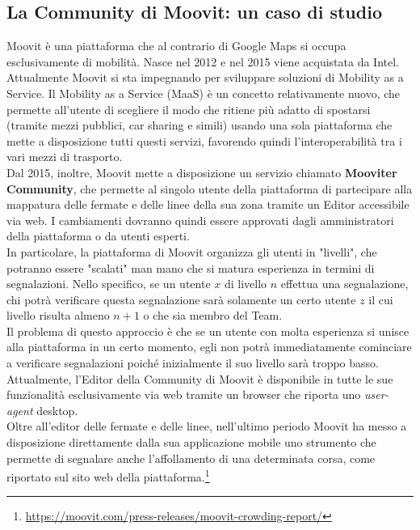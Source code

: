     \subsection{La Community di Moovit: un caso di studio}
        Moovit è una piattaforma che al contrario di Google Maps si occupa esclusivamente di mobilità.
        Nasce nel 2012 e nel 2015 viene acquistata da Intel. Attualmente Moovit si sta impegnando per sviluppare soluzioni di Mobility as a Service.
        Il Mobility as a Service (MaaS) è un concetto relativamente nuovo, che permette all'utente di scegliere il modo che ritiene più adatto di spostarsi (tramite mezzi pubblici, car sharing e simili) usando una sola piattaforma che mette a disposizione tutti questi servizi, favorendo quindi l'interoperabilità tra i vari mezzi di trasporto. \\

        Dal 2015, inoltre, Moovit mette a disposizione un servizio chiamato \textbf{Mooviter Community}, che permette al singolo utente della piattaforma di partecipare alla mappatura delle fermate e delle linee della sua zona tramite un Editor accessibile via web. I cambiamenti dovranno quindi essere approvati dagli amministratori della piattaforma o da utenti esperti. \\

        In particolare, la piattaforma di Moovit organizza gli utenti in "livelli", che potranno essere "scalati" man mano che si matura esperienza in termini di segnalazioni. Nello specifico, se un utente $x$ di livello $n$ effettua una segnalazione, chi potrà verificare questa segnalazione sarà solamente un certo utente $z$ il cui livello risulta almeno $n + 1$ o che sia membro del Team. \\
        Il problema di questo approccio è che se un utente con molta esperienza si unisce alla piattaforma in un certo momento, egli non potrà immediatamente cominciare a verificare segnalazioni poiché inizialmente il suo livello sarà troppo basso.\\
        Attualmente, l'Editor della Community di Moovit è disponibile in tutte le sue funzionalità esclusivamente via web tramite un browser che riporta uno \textit{user-agent} desktop. \\

        Oltre all'editor delle fermate e delle linee, nell'ultimo periodo Moovit ha messo a disposizione direttamente dalla sua applicazione mobile uno strumento che permette di segnalare anche l'affollamento di una determinata corsa, come riportato sul sito web della piattaforma.\footnote[4]{\url{https://moovit.com/press-releases/moovit-crowding-report/}}

